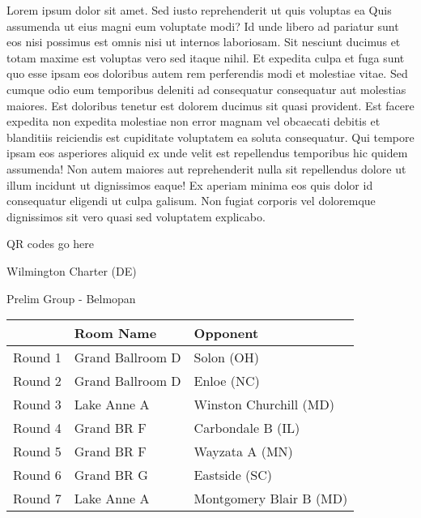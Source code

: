 \documentclass{article}%
\begin{document}
\vspace*{8pt}%
\linebreak%
\newline%
\newline%
Lorem ipsum dolor sit amet. Sed iusto reprehenderit ut quis voluptas ea Quis assumenda ut eius magni eum voluptate modi? Id unde libero ad pariatur sunt eos nisi possimus est omnis nisi ut internos laboriosam. Sit nesciunt ducimus et totam maxime est voluptas vero sed itaque nihil. Et expedita culpa et fuga sunt quo esse ipsam eos doloribus autem rem perferendis modi et molestiae vitae.\newline%
\newline%
Sed cumque odio eum temporibus deleniti ad consequatur consequatur aut molestias maiores. Est doloribus tenetur est dolorem ducimus sit quasi provident. Est facere expedita non expedita molestiae non error magnam vel obcaecati debitis et blanditiis reiciendis est cupiditate voluptatem ea soluta consequatur. Qui tempore ipsam eos asperiores aliquid ex unde velit est repellendus temporibus hic quidem assumenda!\newline%
\newline%
Non autem maiores aut reprehenderit nulla sit repellendus dolore ut illum incidunt ut dignissimos eaque! Ex aperiam minima eos quis dolor id consequatur eligendi ut culpa galisum. Non fugiat corporis vel doloremque dignissimos sit vero quasi sed voluptatem explicabo.\newline%
\newline%
%
\vspace*{30pt}%
\begin{center}%
\begin{Huge}%
QR codes go here%
\end{Huge}%
\end{center}%
\newpage%
%
\begin{center}%
\begin{Huge}%
Wilmington Charter (DE)%
\end{Huge}%
\vspace*{8pt}%
\linebreak%
\begin{Large}%
Prelim Group {-} Belmopan%
\end{Large}%
\end{center}%
\begin{tabularx}{\textwidth}{|c|Y|Y|}%
\hline%
&Room Name&Opponent\\%
\hline%
Round 1&Grand Ballroom D&Solon (OH)\\%
Round 2&Grand Ballroom D&Enloe (NC)\\%
Round 3&Lake Anne A&Winston Churchill (MD)\\%
Round 4&Grand BR F&Carbondale B (IL)\\%
Round 5&Grand BR F&Wayzata A (MN)\\%
Round 6&Grand BR G&Eastside (SC)\\%
Round 7&Lake Anne A&Montgomery Blair B (MD)\\%
\hline%
\end{tabularx}%
\end{document}
